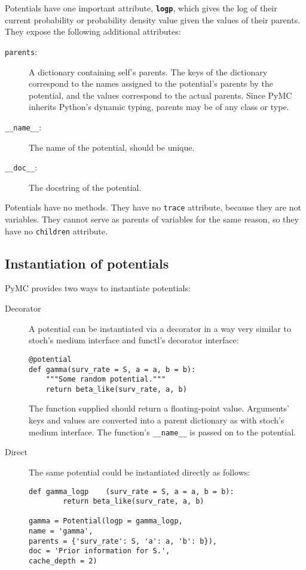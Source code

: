 \bigskip
Potentials have one important attribute, \texttt{\bfseries logp}, which gives the log of their current probability or probability density value given the values of their parents. They expose the following additional attributes:
\begin{description}
    \item[\texttt{parents}:] A dictionary containing self's parents. The keys of the dictionary correspond to the names assigned to the potential's parents by the potential, and the values correspond to the actual parents. Since PyMC inherits Python's dynamic typing, parents may be of any class or type.
    \item[\texttt{\_\_name\_\_}:] The name of the potential, should be unique.
    \item[\texttt{\_\_doc\_\_}:] The docstring of the potential.
\end{description}
Potentials have no methods. They have no \texttt{trace} attribute, because they are not variables. They cannot serve as parents of variables for the same reason, so they have no \texttt{children} attribute.


\subsection{Instantiation of potentials}
PyMC provides two ways to instantiate potentials:
\begin{description}
    \item[Decorator] A potential can be instantiated via a decorator in a way very similar to stoch's medium interface and functl's decorator interface:
\begin{verbatim}
@potential
def gamma(surv_rate = S, a = a, b = b):
    """Some random potential."""
    return beta_like(surv_rate, a, b)
\end{verbatim}
The function supplied should return a floating-point value. Arguments' keys and values are converted into a parent dictionary as with stoch's medium interface. The function's \texttt{\_\_name\_\_} is passed on to the potential.
    \item[Direct] The same potential could be instantiated directly as follows:
\begin{verbatim}
def gamma_logp    (surv_rate = S, a = a, b = b):
        return beta_like(surv_rate, a, b)
        
gamma = Potential(logp = gamma_logp, 
name = 'gamma',
parents = {'surv_rate': S, 'a': a, 'b': b}),
doc = 'Prior information for S.',
cache_depth = 2)
\end{verbatim}
\end{description}

